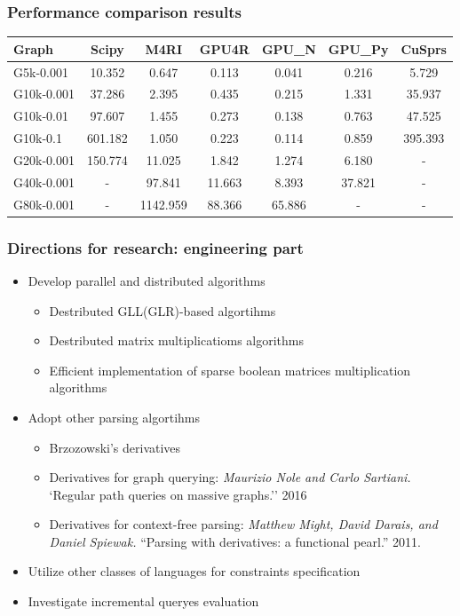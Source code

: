 \documentclass[xcolor=table]{beamer}
\begin{document}
\begin{frame}[fragile]
\frametitle{Performance comparison results}
\centering


{\setlength{\tabcolsep}{0.25em}
\begin{tabular}{| l | c | c | c | c | c | c | }
    \hline
    Graph              & Scipy   & M4RI     & GPU4R  & GPU\_N & GPU\_Py & CuSprs  \\
    \hline
    \hline
    \small{G5k-0.001}  & 10.352  & 0.647    & 0.113  & 0.041  & 0.216   & 5.729   \\
    \small{G10k-0.001} & 37.286  & 2.395    & 0.435  & 0.215  & 1.331   & 35.937  \\
    \small{G10k-0.01}  & 97.607  & 1.455    & 0.273  & 0.138  & 0.763   & 47.525  \\
    \small{G10k-0.1}   & 601.182 & 1.050    & 0.223  & 0.114  & 0.859   & 395.393 \\
    \small{G20k-0.001} & 150.774 & 11.025   & 1.842  & 1.274  & 6.180   & -       \\
    \small{G40k-0.001} & -       & 97.841   & 11.663 & 8.393  & 37.821  & -       \\
    \small{G80k-0.001} & -       & 1142.959 & 88.366 & 65.886 & -       & -       \\
    \hline
  \end{tabular}

}

\end{frame}


\begin{frame} \frametitle{Directions for research: engineering part}
\begin{itemize}
\item Develop parallel and distributed algorithms
\begin{itemize}
   \item Destributed GLL(GLR)-based algortihms
   \item Destributed matrix multiplicatioms algorithms
   \item Efficient implementation of sparse boolean matrices multiplication algorithms
\end{itemize}
\item Adopt other parsing algortihms
\begin{itemize}
   \item Brzozowski’s derivatives
   \item Derivatives for graph querying: \emph{Maurizio Nole and Carlo Sartiani.} `Regular path queries on massive graphs.'' 2016
   \item Derivatives for context-free parsing: \emph{Matthew Might, David Darais, and Daniel Spiewak.} ``Parsing with derivatives: a functional pearl.'' 2011.
\end{itemize}
\item Utilize other classes of languages for constraints specification
\item Investigate incremental queryes evaluation
\end{itemize}
\end{frame}
\end{document}
